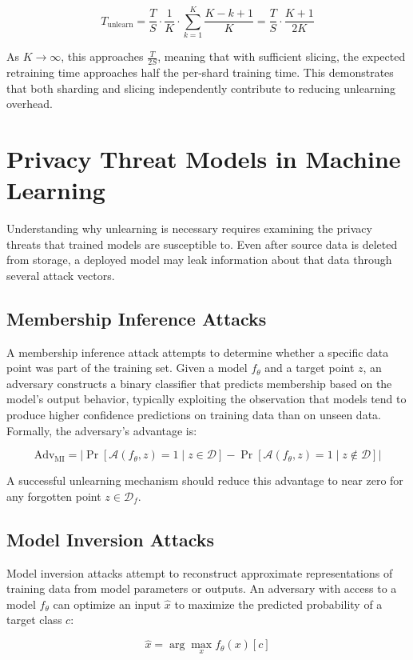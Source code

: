 \[
T_{\text{unlearn}} = \frac{T}{S} \cdot \frac{1}{K} \cdot \sum_{k=1}^{K} \frac{K - k + 1}{K} = \frac{T}{S} \cdot \frac{K+1}{2K}
\]

As $K \to \infty$, this approaches $\frac{T}{2S}$, meaning that with sufficient slicing, the expected retraining time approaches half the per-shard training time. This demonstrates that both sharding and slicing independently contribute to reducing unlearning overhead.

\section{Privacy Threat Models in Machine Learning}

Understanding why unlearning is necessary requires examining the privacy threats that trained models are susceptible to. Even after source data is deleted from storage, a deployed model may leak information about that data through several attack vectors.

\subsection{Membership Inference Attacks}
A membership inference attack attempts to determine whether a specific data point was part of the training set. Given a model $f_\theta$ and a target point $z$, an adversary constructs a binary classifier that predicts membership based on the model's output behavior, typically exploiting the observation that models tend to produce higher confidence predictions on training data than on unseen data. Formally, the adversary's advantage is:

\[
\text{Adv}_{\text{MI}} = \left| \Pr[\mathcal{A}(f_\theta, z) = 1 \mid z \in \mathcal{D}] - \Pr[\mathcal{A}(f_\theta, z) = 1 \mid z \notin \mathcal{D}] \right|
\]

A successful unlearning mechanism should reduce this advantage to near zero for any forgotten point $z \in \mathcal{D}_f$.

\subsection{Model Inversion Attacks}
Model inversion attacks attempt to reconstruct approximate representations of training data from model parameters or outputs. An adversary with access to a model $f_\theta$ can optimize an input $\hat{x}$ to maximize the predicted probability of a target class $c$:

\[
\hat{x} = \arg\max_x f_\theta(x)[c]
\]

